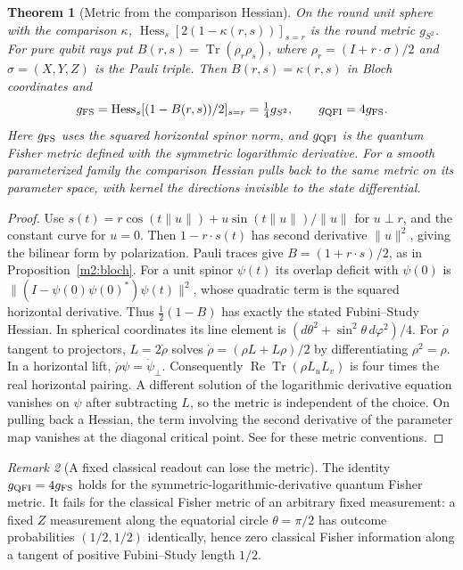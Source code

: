 \documentclass[11pt,reqno]{amsart}
\newtheorem{theorem}{Theorem}[section]
\theoremstyle{definition}
\theoremstyle{remark}
\newtheorem{remark}[theorem]{Remark}
\numberwithin{equation}{section}
\begin{document}
\begin{theorem}[Metric from the comparison Hessian]\label{m11:hessian}
On the round unit sphere with the comparison $\kappa$,
$\operatorname{Hess}_s [2(1-\kappa(r,s))]_{s=r}$ is the
round metric $g_{S^2}$. For pure qubit rays put
$B(r,s)=\operatorname{Tr}(\rho_r\rho_s)$, where
$\rho_r=(I+r\cdot\sigma)/2$ and $\sigma=(X,Y,Z)$ is the Pauli triple.
Then $B(r,s)=\kappa(r,s)$ in Bloch coordinates and
\[
 g_{\rm FS}=
 \operatorname{Hess}_s[(1-B(r,s))/2]_{s=r}
 =\tfrac14 g_{S^2},\qquad g_{\rm QFI}=4g_{\rm FS}.
\]
Here $g_{\rm FS}$ uses the squared horizontal spinor norm, and
$g_{\rm QFI}$ is the quantum Fisher metric defined with the symmetric
logarithmic derivative. For a smooth parameterized family the comparison
Hessian pulls back to the same metric on its parameter space, with kernel
the directions invisible to the state differential.
\end{theorem}
\begin{proof}
Use $s(t)=r\cos(t\|u\|)+u\sin(t\|u\|)/\|u\|$ for $u\perp r$,
and the constant curve for $u=0$. Then $1-r\cdot s(t)$ has
second derivative $\|u\|^2$, giving the bilinear form by polarization.
Pauli traces give $B=(1+r\cdot s)/2$, as in
Proposition~\ref{m2:bloch}. For a unit spinor $\psi(t)$ its
overlap deficit with $\psi(0)$ is
$\|(I-\psi(0)\psi(0)^*)\psi(t)\|^2$, whose quadratic term is the
squared horizontal derivative. Thus $\tfrac12(1-B)$ has exactly
the stated Fubini--Study Hessian. In spherical coordinates its
line element is $(d\theta^2+\sin^2\theta\,d\varphi^2)/4$.
For $\dot\rho$ tangent to projectors, $L=2\dot\rho$ solves
$\dot\rho=(\rho L+L\rho)/2$ by differentiating $\rho^2=\rho$.
In a horizontal lift, $\dot\rho\psi=\dot\psi_\perp$.
Consequently $\operatorname{Re}\operatorname{Tr}(\rho L_uL_v)$
is four times the real horizontal pairing. A different solution
of the logarithmic derivative equation vanishes on $\psi$ after
subtracting $L$, so the metric is independent of the choice.
On pulling back a Hessian, the term involving the second derivative
of the parameter map vanishes at the diagonal critical point.
See \cite{m11:BC,m11:Stokes} for these metric conventions.
\end{proof}

\begin{remark}[A fixed classical readout can lose the metric]\label{m11:readout-refuted}
The identity $g_{\rm QFI}=4g_{\rm FS}$ holds for the symmetric-logarithmic-derivative
quantum Fisher metric. It fails for the classical Fisher metric of an
arbitrary fixed measurement: a fixed $Z$ measurement along the equatorial
circle $\theta=\pi/2$ has outcome probabilities $(1/2,1/2)$ identically,
hence zero classical Fisher information along a tangent of positive
Fubini--Study length $1/2$.
\end{remark}
\end{document}
